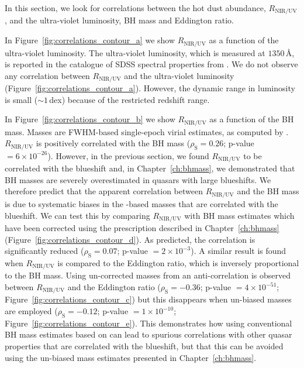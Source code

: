 In this section, we look for correlations between the hot dust abundance, $R_{\text{NIR/UV}}$, and the ultra-violet luminosity, BH mass and Eddington ratio.

In Figure~\ref{fig:correlations_contour_a} we show $R_{\text{NIR/UV}}$ as a function of the ultra-violet luminosity.
The ultra-violet luminosity, which is measured at $1350$\,\AA, is reported in the catalogue of SDSS spectral properties from \citet{shen11}.
We do not observe any correlation between $R_{\text{NIR/UV}}$ and the ultra-violet luminosity (Figure~\ref{fig:correlations_contour_a}).
However, the dynamic range in luminosity is small ($\sim1$\,dex) because of the restricted redshift range.

In Figure~\ref{fig:correlations_contour_b} we show $R_{\text{NIR/UV}}$ as a function of the BH mass.
Masses are  FWHM-based single-epoch virial estimates, as computed by \citet{shen11}.
$R_{\text{NIR/UV}}$ is positively correlated with the BH mass ($\rho_{\text{S}} = 0.26$; p-value $=6\times10^{-26
}$).
However, in the previous section, we found $R_{\text{NIR/UV}}$ to be correlated with the  blueshift and, in Chapter~\ref{ch:bhmass}, we demonstrated that BH masses are severely overestimated in quasars with large  blueshifts.
We therefore predict that the apparent correlation between $R_{\text{NIR/UV}}$ and the BH mass is due to systematic biases in the -based masses that are correlated with the  blueshift.
We can test this by comparing $R_{\text{NIR/UV}}$ with BH mass estimates which have been corrected using the prescription described in Chapter~\ref{ch:bhmass} (Figure~\ref{fig:correlations_contour_d}).
As predicted, the correlation is significantly reduced ($\rho_{\text{S}}=0.07$; p-value $=2\times10^{-3}$).
A similar result is found when $R_{\text{NIR/UV}}$ is compared to the Eddington ratio, which is inversely proportional to the BH mass.
Using un-corrected masses from \citet{shen11} an anti-correlation is observed between $R_{\text{NIR/UV}}$ and the Eddington ratio ($\rho_{\text{S}}=-0.36$; p-value $=4\times10^{-51}$; Figure~\ref{fig:correlations_contour_c}) but this disappears when un-biased masses are employed ($\rho_{\text{S}}=-0.12$; p-value $=1\times10^{-10}$; Figure~\ref{fig:correlations_contour_e}).
This demonstrates how using conventional BH mass estimates based on  can lead to spurious correlations with other quasar properties that are correlated with the  blueshift, but that this can be avoided using the un-biased mass estimates presented in Chapter~\ref{ch:bhmass}.

